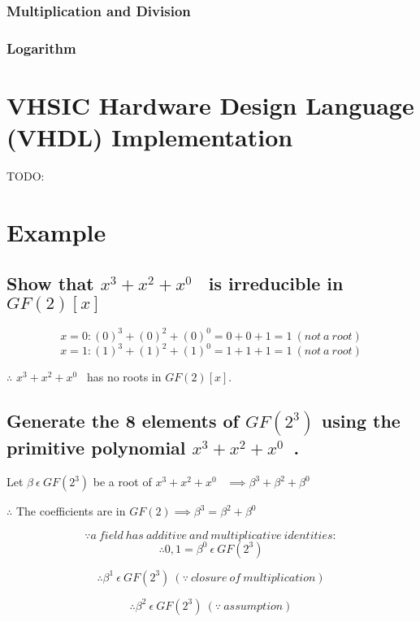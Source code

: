 \documentclass[paper=usletter, fontsize=12pt]{article}
\newcommand{\polynomial}{$x^{3}+x^{2}+x^{0}$}
\begin{document}
            \subsubsection{Multiplication and Division}

            \subsubsection{Logarithm}

            \newpage

    \section{VHSIC Hardware Design Language (VHDL) Implementation}
    TODO:

    \section{Example}
        \subsection{Show that \polynomial~ is irreducible in $GF(2)[x]$}

            \[ x=0: (0)^{3}+(0)^{2}+(0)^{0}=0+0+1=1 \ (not \ a \ root) \]
            \[ x=1: (1)^{3}+(1)^{2}+(1)^{0}=1+1+1=1 \ (not \ a \ root) \]
            \centerline{$\therefore$ \polynomial~ has no roots in $GF(2)[x]$.}

        \subsection{Generate the 8 elements of $GF(2^{3})$ using the primitive polynomial \polynomial~.}

            \centerline{Let $\beta \ \epsilon \ GF(2^{3})$ be a root of \polynomial~ $\implies \beta^{3}+\beta^{2}+\beta^{0}$}

            \hspace*{\fill}
            \centerline{$\therefore$ The coefficients are in $GF(2) \implies \beta^{3}=\beta^{2}+\beta^{0}$}

            \[ \because a \ field \ has \ additive \ and \ multiplicative \ identities: \]
            \[ \therefore 0, 1=\beta^{0} \ \epsilon \ GF(2^{3}) \]

            \[ \therefore \beta^{1} \ \epsilon \ GF(2^{3}) \ (\because \ closure \ of \ multiplication) \]

            \[ \therefore \beta^{2} \ \epsilon \ GF(2^{3}) \ (\because \ assumption) \]
\end{document}
